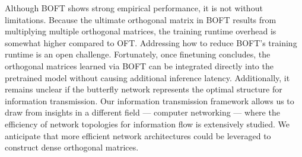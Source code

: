 Although BOFT shows strong empirical performance, it is not without limitations. Because the ultimate orthogonal matrix in BOFT results from multiplying multiple orthogonal matrices, the training runtime overhead is somewhat higher compared to OFT. Addressing how to reduce BOFT's training runtime is an open challenge. Fortunately, once finetuning concludes, the orthogonal matrices learned via BOFT can be integrated directly into the pretrained model without causing additional inference latency. Additionally, it remains unclear if the butterfly network represents the optimal structure for information transmission. Our information transmission framework allows us to draw from insights in a different field — computer networking — where the efficiency of network topologies for information flow is extensively studied. We anticipate that more efficient network architectures could be leveraged to construct dense orthogonal matrices.

